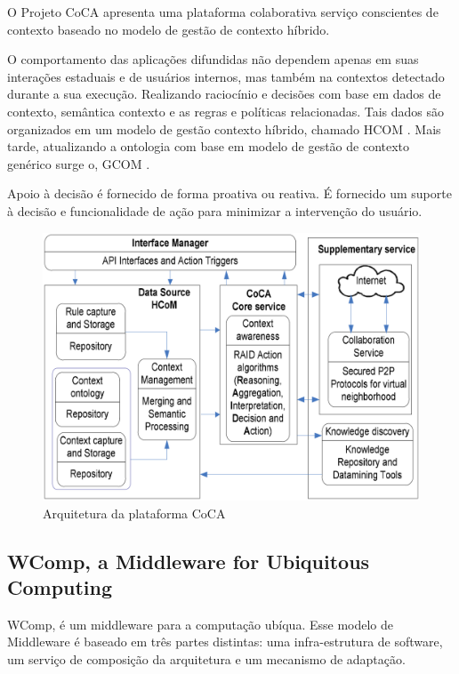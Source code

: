 \documentclass[12pt,a4paper,compsoc]{IEEEtran}
\begin{document}
  O Projeto CoCA \cite{ejigu2008hybrid} apresenta uma plataforma colaborativa serviço conscientes
  de contexto baseado no modelo de gestão de contexto híbrido.
  
  O comportamento das aplicações difundidas não dependem apenas em suas interações estaduais e de
  usuários internos, mas também na contextos detectado durante a sua execução. Realizando 
  raciocínio e decisões com base em dados de contexto, semântica contexto e as regras e políticas
  relacionadas. Tais dados são organizados em um modelo de gestão contexto híbrido, chamado HCOM
  \cite{ejigu2008hybrid}. Mais tarde, atualizando a ontologia com base em modelo de gestão de 
  contexto genérico surge o, GCOM \cite{ejigu2008hybrid}.
  
  Apoio à decisão é fornecido de forma proativa ou reativa. É fornecido um suporte à decisão e 
  funcionalidade de ação para minimizar a intervenção do usuário.

  \begin{figure}[t!]
    \centerline{\includegraphics[scale=.2]{imagens/arquitetura-coca}}
    \caption{Arquitetura da plataforma CoCA \cite{ejigu2008hybrid}}
    \label{arquitetura-coca}
  \end{figure}


\subsection{WComp, a Middleware for Ubiquitous Computing}

  WComp, é um middleware para a computação ubíqua. Esse modelo de Middleware é baseado em três
  partes distintas: uma infra-estrutura de software,  um serviço de composição da arquitetura e um
  mecanismo de adaptação.
  
\end{document}
